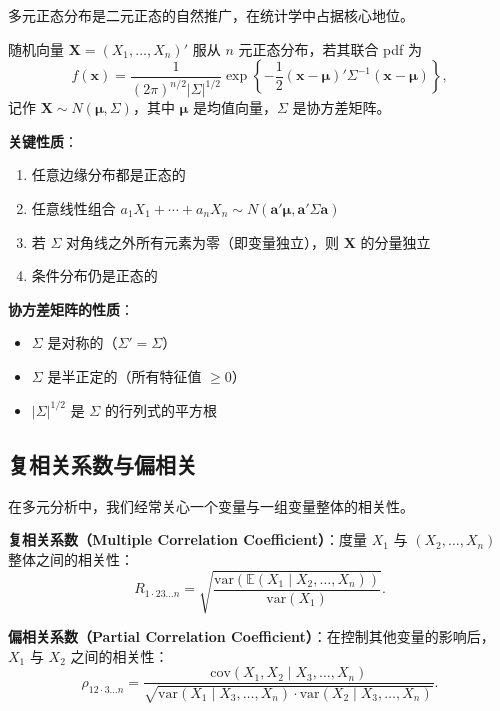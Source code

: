 多元正态分布是二元正态的自然推广，在统计学中占据核心地位。

\begin{definition}[$n$ 元正态分布]\label{def:multivariate-normal-ch2}
随机向量 $\mathbf{X} = (X_1, \ldots, X_n)'$ 服从 $n$ 元正态分布，若其联合 pdf 为
\[
f(\mathbf{x}) = \frac{1}{(2\pi)^{n/2} |\Sigma|^{1/2}} \exp\left\{ -\frac{1}{2} (\mathbf{x} - \boldsymbol{\mu})' \Sigma^{-1} (\mathbf{x} - \boldsymbol{\mu}) \right\},
\]
记作 $\mathbf{X} \sim N(\boldsymbol{\mu}, \Sigma)$，其中 $\boldsymbol{\mu}$ 是均值向量，$\Sigma$ 是协方差矩阵。
\end{definition}

\textbf{关键性质}：
\begin{enumerate}
\item 任意边缘分布都是正态的
\item 任意线性组合 $a_1 X_1 + \cdots + a_n X_n \sim N(\mathbf{a}'\boldsymbol{\mu}, \mathbf{a}'\Sigma\mathbf{a})$
\item 若 $\Sigma$ 对角线之外所有元素为零（即变量独立），则 $\mathbf{X}$ 的分量独立
\item 条件分布仍是正态的
\end{enumerate}

\textbf{协方差矩阵的性质}：
\begin{itemize}
\item $\Sigma$ 是对称的（$\Sigma' = \Sigma$）
\item $\Sigma$ 是半正定的（所有特征值 $\geq 0$）
\item $|\Sigma|^{1/2}$ 是 $\Sigma$ 的行列式的平方根
\end{itemize}

\subsection{复相关系数与偏相关}

在多元分析中，我们经常关心一个变量与一组变量整体的相关性。

\textbf{复相关系数（Multiple Correlation Coefficient）}：度量 $X_1$ 与 $(X_2, \ldots, X_n)$ 整体之间的相关性：
\[
R_{1\cdot 23\ldots n} = \sqrt{\frac{\text{var}(\mathbb{E}(X_1 \mid X_2, \ldots, X_n))}{\text{var}(X_1)}}.
\]

\textbf{偏相关系数（Partial Correlation Coefficient）}：在控制其他变量的影响后，$X_1$ 与 $X_2$ 之间的相关性：
\[
\rho_{12\cdot 3\ldots n} = \frac{\text{cov}(X_1, X_2 \mid X_3, \ldots, X_n)}{\sqrt{\text{var}(X_1 \mid X_3, \ldots, X_n) \cdot \text{var}(X_2 \mid X_3, \ldots, X_n)}}.
\]

